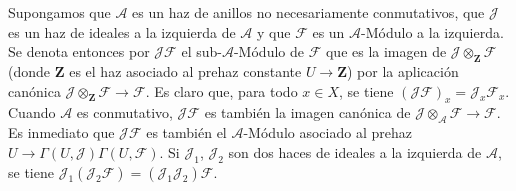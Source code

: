 \begin{env}[4.1.6]
\label{0.4.1.6-fr}
Supongamos que $\mathcal{A}$ es un haz de anillos no necesariamente
conmutativos, que $\mathcal{J}$ es un haz de ideales a la izquierda de
$\mathcal{A}$ y que $\mathcal{F}$ es un $\mathcal{A}$-Módulo a la izquierda.
Se denota entonces por $\mathcal{J}\mathcal{F}$ el sub-$\mathcal{A}$-Módulo de
$\mathcal{F}$ que es la imagen de $\mathcal{J}\otimes_{\mathbf Z}\mathcal{F}$
(donde $\mathbf Z$ es el haz asociado al prehaz constante $U\to\mathbf Z$) por
la aplicación canónica $\mathcal{J}\otimes_{\mathbf Z}\mathcal{F}\to\mathcal{F}$.
Es claro que, para todo $x\in X$, se tiene
$(\mathcal{J}\mathcal{F})_x=\mathcal{J}_x\mathcal{F}_x$. Cuando
$\mathcal{A}$ es conmutativo, $\mathcal{J}\mathcal{F}$ es también la imagen
canónica de $\mathcal{J}\otimes_{\mathcal{A}}\mathcal{F}\to\mathcal{F}$.
Es inmediato que $\mathcal{J}\mathcal{F}$ es también el $\mathcal{A}$-Módulo
asociado al prehaz $U\to\Gamma(U,\mathcal{J})\Gamma(U,\mathcal{F})$. Si
$\mathcal{J}_1$, $\mathcal{J}_2$ son dos haces de ideales a la izquierda de
$\mathcal{A}$, se tiene
$\mathcal{J}_1(\mathcal{J}_2\mathcal{F})=(\mathcal{J}_1\mathcal{J}_2)\mathcal{F}$.
\end{env}
